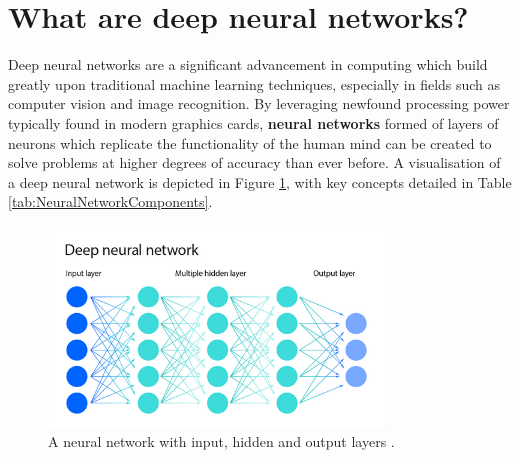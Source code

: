\documentclass[12pt]{report}
\begin{document}

\section{What are deep neural networks?}
Deep neural networks are a significant advancement in computing which build greatly upon traditional 
machine learning techniques, especially in fields such as computer vision and image recognition. By leveraging newfound processing power 
typically found in modern graphics cards, \textbf{neural networks} formed of layers of neurons which replicate the functionality of 
the human mind can be created to solve problems at higher degrees of accuracy than ever before. A visualisation of a deep neural network 
is depicted in Figure \ref{fig:NeuralNetwork}, with key concepts detailed in Table \ref{tab:NeuralNetworkComponents}.

\begin{figure}[H]
    \centering
    \includegraphics[width=0.8\textwidth]{Proposal/NeuralNetworkCropped.png}
    \caption{A neural network with input, hidden and output layers \autocite{ibmWhatNeuralNetwork2021}.\label{fig:NeuralNetwork}}
\end{figure}
\end{document}

